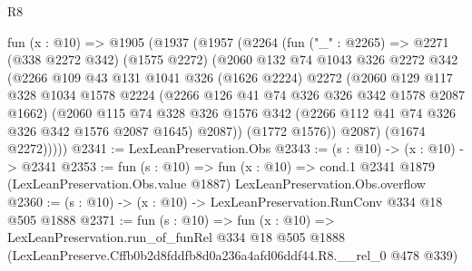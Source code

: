 \begin{lexlean}{R8}
\begin{coremodule}
  fun (x : @10) =>
  @1905
    (@1937
      (@1957
        (@2264
          (fun ("_" : @2265) =>
          @2271
            (@338 @2272 @342)
            (@1575 @2272)
            (@2060
              @132
              @74
              @1043
              @326
              @2272
              @342
              (@2266
                @109
                @43
                @131
                @1041
                @326
                (@1626 @2224)
                @2272
                (@2060
                  @129
                  @117
                  @328
                  @1034
                  @1578
                  @2224
                  (@2266 @126 @41 @74 @326 @326 @342 @1578 @2087 @1662)
                  (@2060
                    @115
                    @74
                    @328
                    @326
                    @1576
                    @342
                    (@2266 @112 @41 @74 @326 @326 @342 @1576 @2087 @1645)
                    @2087))
                (@1772 @1576))
              @2087)
            (@1674 @2272)))))
@2341 := LexLeanPreservation.Obs
@2343 := (s : @10) -> (x : @10) -> @2341
@2353 := fun (s : @10) =>
  fun (x : @10) =>
  cond.{1} @2341 @1879 (LexLeanPreservation.Obs.value @1887) LexLeanPreservation.Obs.overflow
@2360 := (s : @10) -> (x : @10) -> LexLeanPreservation.RunConv @334 @18 @505 @1888
@2371 := fun (s : @10) =>
  fun (x : @10) =>
  LexLeanPreservation.run_of_funRel
    @334
    @18
    @505
    @1888
    (LexLeanPreserve.Cffb0b2d8fddfb8d0a236a4afd06ddf44.R8.__rel_0 @478 @339)
\end{coremodule}
\end{lexlean}
